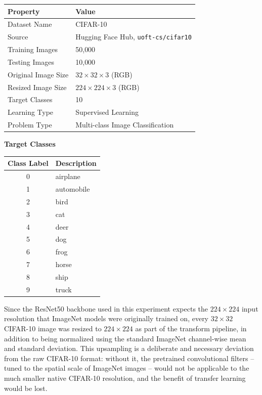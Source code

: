 \documentclass[11pt,a4paper]{article}
\begin{document}
\vspace{0.3cm}

\begin{center}
\begin{tabular}{|p{5cm}|p{7cm}|}
\hline
\textbf{Property} & \textbf{Value}\\
\hline
Dataset Name & CIFAR-10\\
\hline
Source & Hugging Face Hub, \texttt{uoft-cs/cifar10}\\
\hline
Training Images & 50{,}000\\
\hline
Testing Images & 10{,}000\\
\hline
Original Image Size & $32 \times 32 \times 3$ (RGB)\\
\hline
Resized Image Size & $224 \times 224 \times 3$ (RGB)\\
\hline
Target Classes & 10\\
\hline
Learning Type & Supervised Learning\\
\hline
Problem Type & Multi-class Image Classification\\
\hline
\end{tabular}
\end{center}

\vspace{0.15cm}
\textbf{Target Classes}

\begin{center}
\begin{tabular}{|c|p{9cm}|}
\hline
\textbf{Class Label} & \textbf{Description}\\
\hline
0 & airplane\\
\hline
1 & automobile\\
\hline
2 & bird\\
\hline
3 & cat\\
\hline
4 & deer\\
\hline
5 & dog\\
\hline
6 & frog\\
\hline
7 & horse\\
\hline
8 & ship\\
\hline
9 & truck\\
\hline
\end{tabular}
\end{center}

\vspace{0.3cm}

Since the ResNet50 backbone used in this experiment expects the $224\times224$ input resolution that ImageNet models were originally trained on, every $32\times32$ CIFAR-10 image was resized to $224\times224$ as part of the transform pipeline, in addition to being normalized using the standard ImageNet channel-wise mean and standard deviation. This upsampling is a deliberate and necessary deviation from the raw CIFAR-10 format: without it, the pretrained convolutional filters -- tuned to the spatial scale of ImageNet images -- would not be applicable to the much smaller native CIFAR-10 resolution, and the benefit of transfer learning would be lost.
\end{document}
